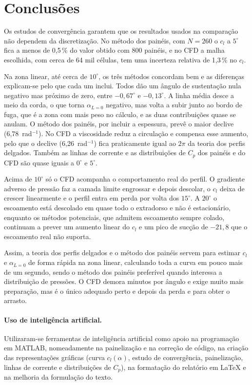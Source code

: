 \section*{Conclusões}

Os estudos de convergência garantem que os resultados usados na comparação não
dependem da discretização. No método dos painéis, com $N = 260$ o $c_l$ a $5^\circ$ fica a
menos de 0,5\,\% do valor obtido com 800 painéis, e no CFD a malha escolhida,
com cerca de 64 mil células, tem uma incerteza relativa de 1,3\,\% no $c_l$.

Na zona linear, até cerca de $10^\circ$, os três métodos concordam bem e as
diferenças explicam-se pelo que cada um inclui. Todos dão um ângulo de
sustentação nula negativo mas próximo de zero, entre $-0{,}67^\circ$ e
$-0{,}13^\circ$. A linha média desce a meio da corda, o que torna $\alpha_{L=0}$
negativo, mas volta a subir junto ao bordo de fuga, que é a zona com mais peso
no cálculo, e as duas contribuições quase se anulam. O método dos painéis, por incluir a espessura, prevê o maior declive
(6,78~rad$^{-1}$). No CFD a viscosidade reduz a circulação e compensa esse
aumento, pelo que o declive (6,26~rad$^{-1}$) fica praticamente igual ao $2\pi$
da teoria dos perfis delgados. Também as linhas de corrente e as distribuições
de $C_p$ dos painéis e do CFD são quase iguais a $0^\circ$ e $5^\circ$.

Acima de $10^\circ$ só o CFD acompanha o comportamento real do perfil. O
gradiente adverso de pressão faz a camada limite engrossar e depois descolar, o
$c_l$ deixa de crescer linearmente e o perfil entra em perda por volta dos
$15^\circ$. A $20^\circ$ o escoamento está descolado em quase todo o extradorso
e não é estacionário, enquanto os métodos potenciais, que admitem escoamento
sempre colado, continuam a prever um aumento linear do $c_l$ e um pico de
sucção de $-21{,}8$ que o escoamento real não suporta.

Assim, a teoria dos perfis delgados e o método dos painéis servem para estimar
$c_l$ e $\alpha_{L=0}$ de forma rápida na zona linear, calculando toda a curva
em pouco mais de um segundo, sendo o método dos painéis preferível quando
interessa a distribuição de pressões. O CFD demora minutos por ângulo e exige
muito mais preparação, mas é o único adequado perto e depois da perda e para
obter o arrasto.

\paragraph{Uso de inteligência artificial.} Utilizaram-se ferramentas de
inteligência artificial como apoio na programação em MATLAB, nomeadamente na
painelização e na correção de código, na criação das representações gráficas
(curva $c_l(\alpha)$, estudo de convergência, painelização, linhas de corrente e
distribuições de $C_p$), na formatação do relatório em \LaTeX{} e na melhoria da
formulação do texto.
